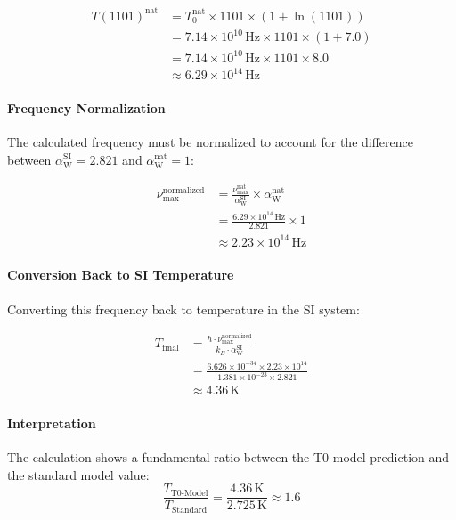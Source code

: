 \documentclass[12pt,a4paper]{article}
\newcommand{\alphaW}{\alpha_{\text{W}}}
\begin{document}
	\begin{align}
		T(1101)^{\text{nat}} &= T_0^{\text{nat}} \times 1101 \times (1 + \ln(1101)) \\
		&= 7.14 \times 10^{10} \, \text{Hz} \times 1101 \times (1 + 7.0) \\
		&= 7.14 \times 10^{10} \, \text{Hz} \times 1101 \times 8.0 \\
		&\approx 6.29 \times 10^{14} \, \text{Hz}
	\end{align}
	
	\paragraph{Frequency Normalization}
	The calculated frequency must be normalized to account for the difference between \(\alphaW^{\text{SI}} = 2.821\) and \(\alphaW^{\text{nat}} = 1\):
	
	\begin{align}
		\nu_{\text{max}}^{\text{normalized}} &= \frac{\nu_{\text{max}}^{\text{nat}}}{\alphaW^{\text{SI}}} \times \alphaW^{\text{nat}} \\
		&= \frac{6.29 \times 10^{14} \, \text{Hz}}{2.821} \times 1 \\
		&\approx 2.23 \times 10^{14} \, \text{Hz}
	\end{align}
	
	\paragraph{Conversion Back to SI Temperature}
	Converting this frequency back to temperature in the SI system:
	
	\begin{align}
		T_{\text{final}} &= \frac{h \cdot \nu_{\text{max}}^{\text{normalized}}}{k_B \cdot \alphaW^{\text{SI}}} \\
		&= \frac{6.626 \times 10^{-34} \times 2.23 \times 10^{14}}{1.381 \times 10^{-23} \times 2.821} \\
		&\approx 4.36 \, \text{K}
	\end{align}
	
	\paragraph{Interpretation}
	The calculation shows a fundamental ratio between the T0 model prediction and the standard model value:
	\begin{equation}
		\frac{T_{\text{T0-Model}}}{T_{\text{Standard}}} = \frac{4.36 \, \text{K}}{2.725 \, \text{K}} \approx 1.6
	\end{equation}
	
\end{document}

